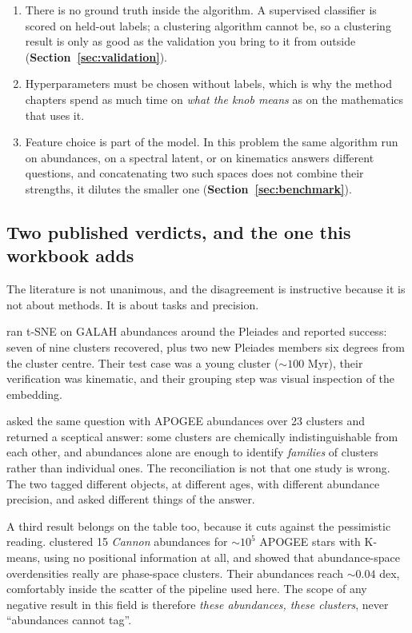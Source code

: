 \begin{issues}
\begin{enumerate}
\item There is no ground truth inside the algorithm. A supervised classifier
  is scored on held-out labels; a clustering algorithm cannot be, so a
  clustering result is only as good as the validation you bring to it from
  outside (\textbf{Section~\ref{sec:validation}}).
\item Hyperparameters must be chosen without labels, which is why the method
  chapters spend as much time on \emph{what the knob means} as on the
  mathematics that uses it.
\item Feature choice is part of the model. In this problem the same algorithm
run on abundances, on a spectral latent, or on kinematics answers different
questions, and concatenating two such spaces does not combine their strengths,
it dilutes the smaller one (\textbf{Section~\ref{sec:benchmark}}).
\end{enumerate}
\end{issues}

\subsection{Two published verdicts, and the one this workbook adds}

The literature is not unanimous, and the disagreement is instructive because it
is not about methods. It is about tasks and precision.

\citet{Kos:17} ran t-SNE on GALAH abundances around the Pleiades and reported
success: seven of nine clusters recovered, plus two new Pleiades members six
degrees from the cluster centre. Their test case was a young cluster
($\sim\!100$ Myr), their verification was kinematic, and their grouping step
was visual inspection of the embedding.

\citet{GarciaDias:19} asked the same question with APOGEE abundances over
23 clusters and returned a sceptical answer: some clusters are chemically
indistinguishable from each other, and abundances alone are enough to
identify \emph{families} of clusters rather than individual ones. The
reconciliation is not that one study is wrong. The two tagged different
objects, at different ages, with different abundance precision, and asked
different things of the answer.

A third result belongs on the table too, because it cuts against the
pessimistic reading. \citet{Hogg:16} clustered 15 \emph{Cannon} abundances for
$\sim\!10^5$ APOGEE stars with K-means, using no positional information at all,
and showed that abundance-space overdensities really are phase-space clusters.
Their abundances reach $\sim\!0.04$ dex, comfortably inside the scatter of the
pipeline used here. The scope of any negative result in this field is therefore
\emph{these abundances, these clusters}, never ``abundances cannot tag''.

